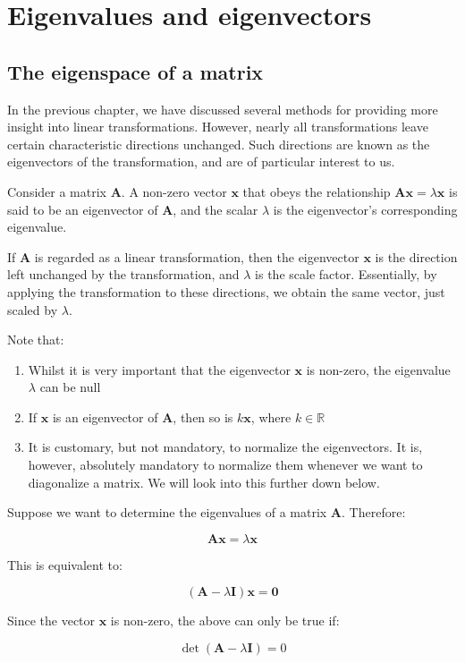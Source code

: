 \documentclass[12pt]{article}
\begin{document}
\newpage

\section{Eigenvalues and eigenvectors}

\subsection{The eigenspace of a matrix}

In the previous chapter, we have discussed several methods for providing more insight into linear transformations. However, nearly all transformations leave certain characteristic directions unchanged. Such directions are known as the eigenvectors of the transformation, and are of particular interest to us.

\begin{definition}[Eigenvector]
    Consider a matrix $\mathbf{A}$. A non-zero vector $\mathbf{x}$ that obeys the relationship $\mathbf{Ax} = \lambda\mathbf{x}$ is said to be an eigenvector of $\mathbf{A}$, and the scalar $\lambda$ is the eigenvector's corresponding eigenvalue.
\end{definition}

If $\mathbf{A}$ is regarded as a linear transformation, then the eigenvector $\mathbf{x}$ is the direction left unchanged by the transformation, and $\lambda$ is the scale factor. Essentially, by applying the transformation to these directions, we obtain the same vector, just scaled by $\lambda$.

Note that:

\begin{enumerate}
    \item Whilst it is very important that the eigenvector $\mathbf{x}$ is non-zero, the eigenvalue $\lambda$ can be null
    \item If $\mathbf{x}$ is an eigenvector of $\mathbf{A}$, then so is $k\mathbf{x}$, where $k \in \mathbb{R}$
    \item It is customary, but not mandatory, to normalize the eigenvectors. It is, however, absolutely mandatory to normalize them whenever we want to diagonalize a matrix. We will look into this further down below.
\end{enumerate}

\begin{proposition}
    Suppose we want to determine the eigenvalues of a matrix $\mathbf{A}$. Therefore:

    \[ \mathbf{Ax} = \lambda\mathbf{x} \]

    This is equivalent to:

    \[ (\mathbf{A} - \lambda\mathbf{I})\mathbf{x} = \mathbf{0} \]

    Since the vector $\mathbf{x}$ is non-zero, the above can only be true if:

    \[ \det{\left(\mathbf{A} - \lambda\mathbf{I}\right)} = 0 \]
\end{proposition}
\end{document}

